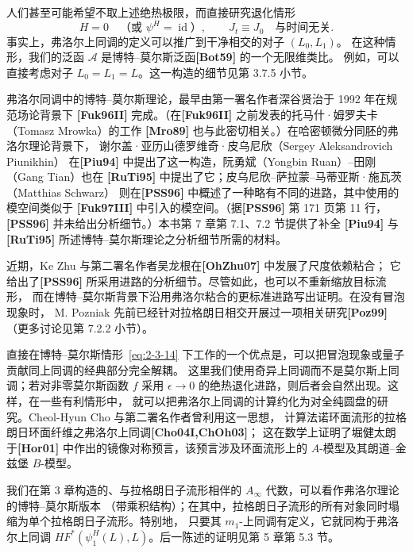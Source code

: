 人们甚至可能希望不取上述绝热极限，而直接研究退化情形
\begin{equation}
  H=0\quad\text{（或 $\psi^H=\operatorname{id}$）},
  \qquad
  J_t\equiv J_0\quad\text{与时间无关}.
  \tag{2.3.14}\label{eq:2-3-14}
\end{equation}
事实上，弗洛尔上同调的定义可以推广到干净相交的对子 $(L_0,L_1)$。
在这种情形，我们的泛函 $\mathcal A$ 是博特--莫尔斯泛函\textbf{[Bot59]} 的一个无限维类比。
例如，可以直接考虑对子 $L_0=L_1=L$。这一构造的细节见第 3.7.5 小节。

弗洛尔同调中的博特--莫尔斯理论，最早由第一署名作者深谷贤治于 1992 年在规范场论背景下
\textbf{[Fuk96II]} 完成。（在\textbf{[Fuk96II]} 之前发表的托马什·姆罗夫卡（Tomasz Mrowka）的工作
\textbf{[Mro89]} 也与此密切相关。）在哈密顿微分同胚的弗洛尔理论背景下，
谢尔盖·亚历山德罗维奇·皮乌尼欣（Sergey Aleksandrovich Piunikhin）
在\textbf{[Piu94]} 中提出了这一构造，阮勇斌（Yongbin Ruan）--田刚（Gang Tian）也在
\textbf{[RuTi95]} 中提出了它；皮乌尼欣--萨拉蒙--马蒂亚斯·施瓦茨（Matthias Schwarz）
则在\textbf{[PSS96]} 中概述了一种略有不同的进路，其中使用的模空间类似于
\textbf{[Fuk97III]} 中引入的模空间。（据\textbf{[PSS96]} 第 171 页第 11 行，
\textbf{[PSS96]} 并未给出分析细节。）本书第 7 章第 7.1、7.2 节提供了补全
\textbf{[Piu94]} 与\textbf{[RuTi95]} 所述博特--莫尔斯理论之分析细节所需的材料。

近期，Ke Zhu 与第二署名作者吴龙根在\textbf{[OhZhu07]} 中发展了尺度依赖粘合；
它给出了\textbf{[PSS96]} 所采用进路的分析细节。尽管如此，也可以不重新缩放目标流形，
而在博特--莫尔斯背景下沿用弗洛尔粘合的更标准进路写出证明。在没有冒泡现象时，
M. Pozniak 先前已经针对拉格朗日相交开展过一项相关研究\textbf{[Poz99]}
（更多讨论见第 7.2.2 小节）。

直接在博特--莫尔斯情形~\eqref{eq:2-3-14} 下工作的一个优点是，可以把冒泡现象或量子贡献同上同调的经典部分完全解耦。
这里我们使用奇异上同调而不是莫尔斯上同调；若对非零莫尔斯函数 $f$ 采用
$\epsilon\to0$ 的绝热退化进路，则后者会自然出现。这样，在一些有利情形中，
就可以把弗洛尔上同调的计算约化为对全纯圆盘的研究。Cheol-Hyun Cho 与第二署名作者曾利用这一思想，
计算法诺环面流形的拉格朗日环面纤维之弗洛尔上同调\textbf{[Cho04I,ChOh03]}；
这在数学上证明了堀健太朗于\textbf{[Hor01]} 中作出的镜像对称预言，该预言涉及环面流形上的
$A$-模型及其朗道--金兹堡 $B$-模型。

我们在第 3 章构造的、与拉格朗日子流形相伴的 $A_\infty$ 代数，可以看作弗洛尔理论的博特--莫尔斯版本
（带乘积结构）；在其中，拉格朗日子流形的所有对象同时塌缩为单个拉格朗日子流形。特别地，
只要其 $m_1$-上同调有定义，它就同构于弗洛尔上同调
$HF^*(\psi_1^H(L),L)$。后一陈述的证明见第 5 章第 5.3 节。
